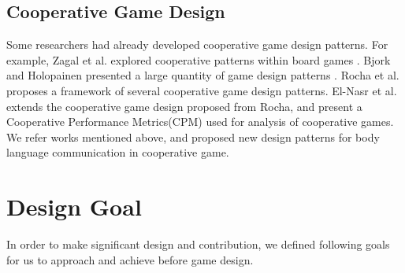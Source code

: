 \documentclass{sigchi}
\begin{document}
\subsection{Cooperative Game Design}

Some researchers had already developed cooperative game design patterns. For example, Zagal et al. explored cooperative patterns within board games \cite{CG1}. Bjork and Holopainen presented a large quantity of game design patterns \cite{CG3}. Rocha et al. \cite{CG4} proposes a framework of several cooperative game design patterns. El-Nasr et al. \cite{CPMs} extends the cooperative game design proposed from Rocha, and present a Cooperative Performance Metrics(CPM) used for analysis of cooperative games. We refer works mentioned above, and proposed new design patterns for body language communication in cooperative game.

\section{Design Goal}
In order to make significant design and contribution, we defined following goals for us to approach and achieve before game design.
\end{document}
